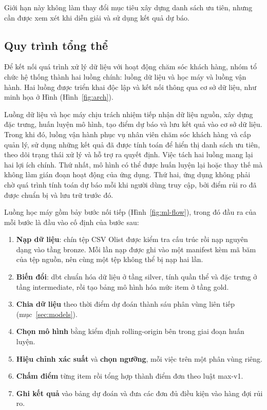 \documentclass[12pt,a4paper]{report}
\begin{document}
Giới hạn này không làm thay đổi mục tiêu xây dựng danh sách ưu tiên, nhưng cần được xem xét khi diễn giải và sử dụng kết quả dự báo.

\subsection{Quy trình tổng thể}

Để kết nối quá trình xử lý dữ liệu với hoạt động chăm sóc khách hàng, nhóm tổ chức hệ thống thành hai luồng chính: luồng dữ liệu và học máy và luồng vận hành. Hai luồng được triển khai độc lập và kết nối thông qua cơ sở dữ liệu, như minh họa ở Hình (Hình~\ref{fig:arch}).

Luồng dữ liệu và học máy chịu trách nhiệm tiếp nhận dữ liệu nguồn, xây dựng đặc trưng, huấn luyện mô hình, tạo điểm dự báo và lưu kết quả vào cơ sở dữ liệu. Trong khi đó, luồng vận hành phục vụ nhân viên chăm sóc khách hàng và cấp quản lý, sử dụng những kết quả đã được tính toán để hiển thị danh sách ưu tiên, theo dõi trạng thái xử lý và hỗ trợ ra quyết định. Việc tách hai luồng mang lại hai lợi ích chính. Thứ nhất, mô hình có thể được huấn luyện lại hoặc thay thế mà không làm gián đoạn hoạt động của ứng dụng. Thứ hai, ứng dụng không phải chờ quá trình tính toán dự báo mỗi khi người dùng truy cập, bởi điểm rủi ro đã được chuẩn bị và lưu trữ trước đó.

Luồng học máy gồm bảy bước nối tiếp (Hình~\ref{fig:ml-flow}), trong đó đầu ra của mỗi bước là đầu vào cố định của bước sau:
\begin{enumerate}
  \item \textbf{Nạp dữ liệu}: chín tệp CSV Olist được kiểm tra cấu trúc rồi nạp nguyên dạng vào tầng bronze. Mỗi lần nạp được ghi vào một manifest kèm mã băm của tệp nguồn, nên cùng một tệp không thể bị nạp hai lần.
  \item \textbf{Biến đổi}: dbt chuẩn hóa dữ liệu ở tầng silver, tính quần thể và đặc trưng ở tầng intermediate, rồi tạo bảng mô hình hóa mức item ở tầng gold.
  \item \textbf{Chia dữ liệu} theo thời điểm dự đoán thành sáu phân vùng liên tiếp (mục~\ref{sec:models}).
  \item \textbf{Chọn mô hình} bằng kiểm định rolling-origin bên trong giai đoạn huấn luyện.
  \item \textbf{Hiệu chỉnh xác suất} và \textbf{chọn ngưỡng}, mỗi việc trên một phân vùng riêng.
  \item \textbf{Chấm điểm} từng item rồi tổng hợp thành điểm đơn theo luật max-v1.
  \item \textbf{Ghi kết quả} vào bảng dự đoán và đưa các đơn đủ điều kiện vào hàng đợi rủi ro.
\end{enumerate}
\end{document}
